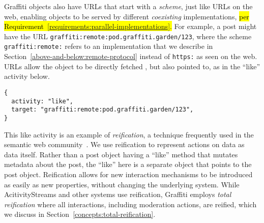 Graffiti objects also have URLs that
start with a \emph{scheme}, just like URLs on the web,
enabling objects to be served by different \emph{coexisting} implementations,
\hl{%
per Requirement~{\ref{requirements:parallel-implementations}}.
}%
For example, a post might have the URL
\texttt{graffiti:\allowbreak{}remote:\allowbreak{}pod.\allowbreak{}graffiti.\allowbreak{}garden/\allowbreak{}123},
where the scheme \texttt{graffiti:\allowbreak{}remote:} refers to an implementation that we describe
in Section~\ref{above-and-below:remote-protocol}
instead of \texttt{https:} as seen on the web.
URLs allow the object to be directly fetched%
, but also pointed to, as in the
``like'' activity below.


\begin{verbatim}
{
  activity: "like",
  target: "graffiti:remote:pod.graffiti.garden/123",
}
\end{verbatim}

This like activity is an example of \emph{reification},
a technique frequently used in the semantic web community~\cite{rdfprimer}.   We use reification to represent actions on data as data itself.
Rather than a post object having a ``like'' method that mutates metadata about the post,
the ``like'' here is a separate object that points to the post object.
Reification allows for new interaction mechanisms to be introduced as easily as new properties,
without changing the underlying system.
While AcitivityStreams and other systems use reification,
Graffiti employs \emph{total reification} where
all interactions, including moderation actions, are reified,
which we discuss in
Section~\ref{concepts:total-reification}.

